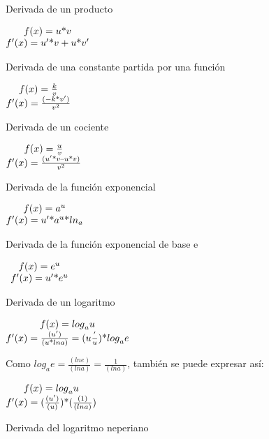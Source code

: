 \documentclass{article}
\newcommand\normalsubformula[1]{\text{\mathversion{normal}$#1$}}
\begin{document}
Derivada de un producto

 $\begin{matrix}f(x)=u\normalsubformula{\text{*}}v\\f'(x)=u'\normalsubformula{\text{*}}v+u\normalsubformula{\text{*}}v'\end{matrix}$

Derivada de una constante partida por una funci\'on

 $\begin{matrix}f(x)=\frac{k}{v}\\f'(x)=\frac{(-k\normalsubformula{\text{*}}v')}{v^{2}}\end{matrix}$

Derivada de un cociente

 $\begin{matrix}f(x)=\frac{u}{v}\\f'(x)=\frac{(u'\normalsubformula{\text{*}}v\text{--}u\normalsubformula{\text{*}}v)}{v^{2}}\end{matrix}$

Derivada de la funci\'on exponencial

 $\begin{matrix}f(x)=a^{u}\\f'(x)=u'\normalsubformula{\text{*}}a^{u}\normalsubformula{\text{*}}{ln}_{a}\end{matrix}$

Derivada de la funci\'on exponencial de base e

\  $\begin{matrix}f(x)=e^{u}\\f'(x)=u'\normalsubformula{\text{*}}e^{u}\end{matrix}$

Derivada de un logaritmo

 $\begin{matrix}f(x)={log}_{a}u\\f'(x)=\frac{(u')}{(u\normalsubformula{\text{*}}lna)}=(u\frac{'}{u})\normalsubformula{\text{*}}{log}_{a}e\end{matrix}$

Como  ${log}_{a}e=\frac{(lne)}{(lna)}=\frac{1}{(lna)}$, tambi\'en se puede expresar as\'i:

 $\begin{matrix}f(x)={log}_{a}u\\f'(x)=(\frac{(u')}{(u)})\normalsubformula{\text{*}}(\frac{(1)}{(lna)})\end{matrix}$

Derivada del logaritmo neperiano
\end{document}
